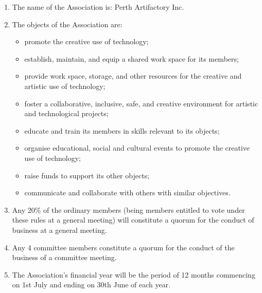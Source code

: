 \documentclass[../constitution.tex]{subfiles}
\begin{document}
\begin{enumerate}[label=\Alph*.]
  \item The name of the Association is: Perth Artifactory Inc.
  \item The objects of the Association are:
    \begin{itemize}
    \item promote the creative use of technology;
    \item establish, maintain, and equip a shared work space for its members;
    \item provide work space, storage, and other resources for the creative and artistic use of technology;
    \item foster a collaborative, inclusive, safe, and creative environment for artistic and technological projects;
    \item educate and train its members in skills relevant to its objects;
    \item organise educational, social and cultural events to promote the creative use of technology;
    \item raise funds to support its other objects;
    \item communicate and collaborate with others with similar objectives.
    \end{itemize}
  \item Any 20\% of the ordinary members (being members entitled to vote under these rules at a general meeting) will constitute a quorum for the conduct of business at a general meeting.
  \item Any 4 committee members constitute a quorum for the conduct of the business of a committee meeting.
  \item The Association's financial year will be the period of 12 months commencing on 1st July and ending on 30th June of each year.
\end{enumerate}
\end{document}
